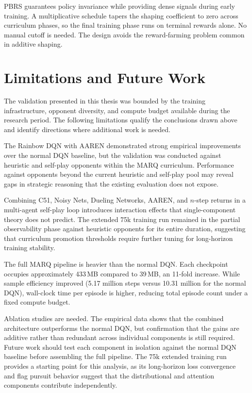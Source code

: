 PBRS guarantees policy invariance while providing dense signals during early training. A multiplicative schedule tapers the shaping coefficient to zero across curriculum phases, so the final training phase runs on terminal rewards alone. No manual cutoff is needed. The design avoids the reward-farming problem common in additive shaping.


\section{Limitations and Future Work}

The validation presented in this thesis was bounded by the training infrastructure, opponent diversity, and compute budget available during the research period. The following limitations qualify the conclusions drawn above and identify directions where additional work is needed.

The Rainbow DQN with AAREN demonstrated strong empirical improvements over the normal DQN baseline, but the validation was conducted against heuristic and self-play opponents within the MARQ curriculum. Performance against opponents beyond the current heuristic and self-play pool may reveal gaps in strategic reasoning that the existing evaluation does not expose.

Combining C51, Noisy Nets, Dueling Networks, AAREN, and $n$-step returns in a multi-agent self-play loop introduces interaction effects that single-component theory does not predict. The extended 75k training run remained in the partial observability phase against heuristic opponents for its entire duration, suggesting that curriculum promotion thresholds require further tuning for long-horizon training stability.

The full MARQ pipeline is heavier than the normal DQN. Each checkpoint occupies approximately 433\,MB compared to 39\,MB, an 11-fold increase. While sample efficiency improved (5.17 million steps versus 10.31 million for the normal DQN), wall-clock time per episode is higher, reducing total episode count under a fixed compute budget.

Ablation studies are needed. The empirical data shows that the combined architecture outperforms the normal DQN, but confirmation that the gains are additive rather than redundant across individual components is still required. Future work should test each component in isolation against the normal DQN baseline before assembling the full pipeline. The 75k extended training run provides a starting point for this analysis, as its long-horizon loss convergence and flag pursuit behavior suggest that the distributional and attention components contribute independently.

